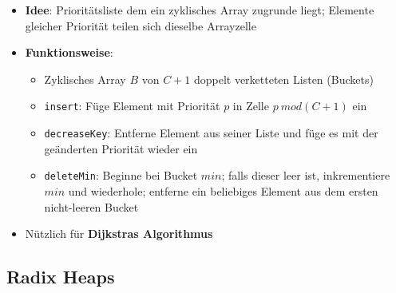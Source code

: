 	\begin{itemize}
		\item \textbf{Idee}: Prioritätsliste dem ein zyklisches Array zugrunde liegt; Elemente gleicher Priorität teilen sich dieselbe Arrayzelle
		\item \textbf{Funktionsweise}:
		\begin{itemize}
			\item Zyklisches Array $B$ von $C + 1$ doppelt verketteten Listen (Buckets)
			\item \texttt{insert}: Füge Element mit Priorität $p$ in Zelle $p\ mod (C + 1)$ ein
			\item \texttt{decreaseKey}: Entferne Element aus seiner Liste und füge es mit der geänderten Priorität wieder ein
			\item \texttt{deleteMin}: Beginne bei Bucket $min$; falls dieser leer ist, inkrementiere $min$ und wiederhole; entferne ein beliebiges Element aus dem ersten nicht-leeren Bucket
		\end{itemize}
		\item Nützlich für \textbf{Dijkstras Algorithmus}
	\end{itemize}

	\subsection{Radix Heaps}%
	\label{sub:radix_heaps}
	
